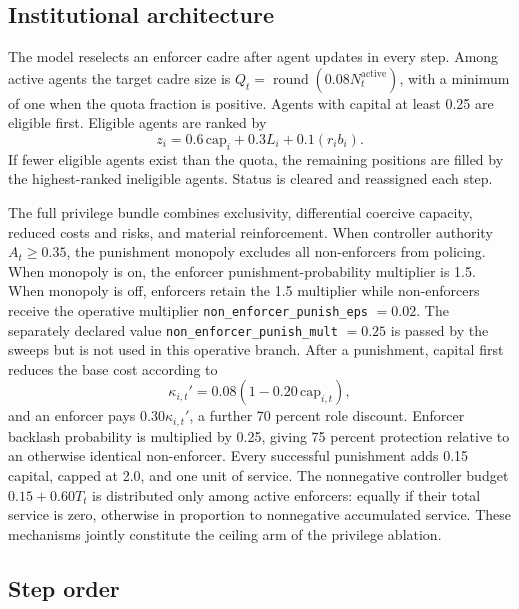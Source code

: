 \subsection{Institutional architecture}

The model reselects an enforcer cadre after agent updates in every step. Among active agents the target cadre size is \(Q_t=\operatorname{round}(0.08N_t^{\mathrm{active}})\), with a minimum of one when the quota fraction is positive. Agents with capital at least 0.25 are eligible first. Eligible agents are ranked by
\begin{equation}
 z_i=0.6\,\mathrm{cap}_i+0.3L_i+0.1(r_ib_i).
\end{equation}
If fewer eligible agents exist than the quota, the remaining positions are filled by the highest-ranked ineligible agents. Status is cleared and reassigned each step.

The full privilege bundle combines exclusivity, differential coercive capacity, reduced costs and risks, and material reinforcement. When controller authority \(A_t\geq0.35\), the punishment monopoly excludes all non-enforcers from policing. When monopoly is on, the enforcer punishment-probability multiplier is 1.5. When monopoly is off, enforcers retain the 1.5 multiplier while non-enforcers receive the operative multiplier \texttt{non\_enforcer\_punish\_eps} \(=0.02\). The separately declared value \texttt{non\_enforcer\_punish\_mult} \(=0.25\) is passed by the sweeps but is not used in this operative branch. After a punishment, capital first reduces the base cost according to
\begin{equation}
 \kappa_{i,t}'=0.08\left(1-0.20\,\mathrm{cap}_{i,t}\right),
\end{equation}
and an enforcer pays \(0.30\kappa_{i,t}'\), a further 70 percent role discount. Enforcer backlash probability is multiplied by 0.25, giving 75 percent protection relative to an otherwise identical non-enforcer. Every successful punishment adds 0.15 capital, capped at 2.0, and one unit of service. The nonnegative controller budget \(0.15+0.60T_t\) is distributed only among active enforcers: equally if their total service is zero, otherwise in proportion to nonnegative accumulated service. These mechanisms jointly constitute the ceiling arm of the privilege ablation.

\subsection{Step order}

